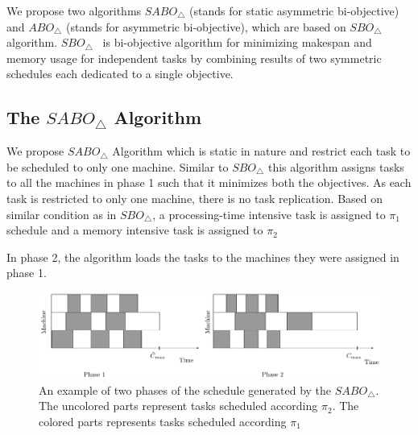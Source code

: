 \documentclass[twocolumn]{svjour3}
\begin{document}
We propose two algorithms $SABO_\triangle$ (stands for static
asymmetric bi-objective) and $ABO_\triangle$ (stands for asymmetric
bi-objective), which are based on $SBO_\triangle$
algorithm. $SBO_\triangle$~\cite{SDM2008} is
bi-objective algorithm for minimizing makespan and memory usage for
independent tasks by combining results of two symmetric schedules each
dedicated to a single objective.
 
\subsection{The $SABO_\triangle$ Algorithm}
                     
We propose $SABO_\triangle$ Algorithm which is static in nature and
restrict each task to be scheduled to only one machine. Similar to
$SBO_\triangle$ this algorithm assigns tasks to all the machines in
phase 1 such that it minimizes both the objectives. As each task is
restricted to only one machine, there is no task replication. Based on
similar condition as in $SBO_\triangle$, a processing-time intensive
task is assigned to $\pi_1$ schedule and a memory intensive task is
assigned to $\pi_2$
                     
In phase 2, the algorithm loads the tasks to the machines they were assigned in phase 1.\\
                     
\begin{figure}[htp]
  \centering
  \includegraphics[width= 16 cm]{mem2.pdf}
  \caption{An example of two phases of the schedule generated by the
    $SABO_\triangle$. The uncolored parts represent tasks scheduled
    according $\pi_2$. The colored parts represents tasks scheduled
    according $\pi_1$}
  \label{fig:ch5-1}
\end{figure} 
\end{document}

